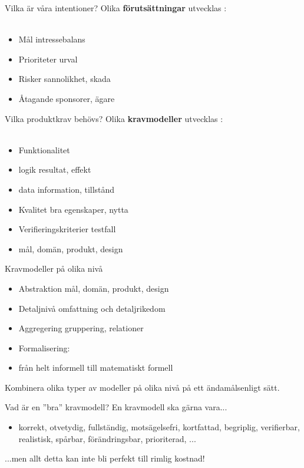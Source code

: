 \documentclass{simpleslides}
\begin{document}
\begin{Slide}{Vilka är våra intentioner?}
Olika  \textbf{förutsättningar} utvecklas : \\~
\begin{itemize}
\item Mål \hfill intressebalans
\item Prioriteter  \hfill urval
\item Risker \hfill sannolikhet, skada
\item Åtagande \hfill sponsorer, ägare
\end{itemize}
\end{Slide}

\begin{Slide}{Vilka produktkrav behövs?}
Olika  \textbf{kravmodeller} utvecklas : \\~
\begin{itemize}
\item Funktionalitet
\item []logik \hfill resultat, effekt
\item []data  \hfill information, tillstånd
\item Kvalitet \hfill bra egenskaper, nytta
\item Verifieringskriterier \hfill testfall 
\item [] \hfill mål, domän, produkt, design
\end{itemize}
\end{Slide}

\begin{Slide}{Kravmodeller på olika nivå}
\begin{itemize}
\item Abstraktion \hfill mål, domän, produkt, design
\item Detaljnivå \hfill omfattning och detaljrikedom
\item Aggregering \hfill gruppering, relationer
\item Formalisering:
\item [] från helt informell till matematiskt formell
\end{itemize}
\vspace{1em} Kombinera olika typer av modeller på olika nivå på ett ändamålsenligt sätt.
\end{Slide}

\begin{Slide}{Vad är en ''bra'' kravmodell?}
En kravmodell ska gärna vara...
\begin{itemize}
\item korrekt, otvetydig, fullständig, motsägelsefri, kortfattad, begriplig, verifierbar, realistisk, spårbar, förändringsbar, prioriterad, ... 
\end{itemize}
...men allt detta kan inte bli perfekt till rimlig kostnad! 
\end{Slide}
\end{document}
